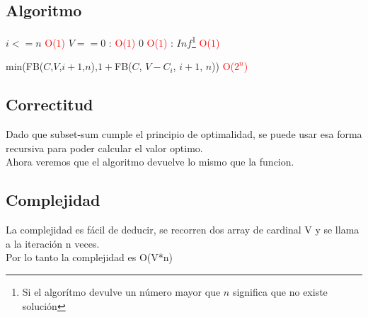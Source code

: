 \subsection{Algoritmo}
\begin{codebox}
    \li \If $i <= n$ \quad\quad\quad\quad\quad\quad\quad\textcolor{red}{O($1$)}
        \Then
    \li        \If $V == 0$ : \quad\quad\quad\quad\quad\quad\textcolor{red}{O($1$)}
                \Then
    \li             \Return $0$ \quad\quad\quad\quad\quad\quad\quad\textcolor{red}{O($1$)}
    \li         \Else: 
    \li                 \Return $Inf$\footnote{Si el algor\'itmo devulve un n\'umero mayor que $n$ significa que no existe soluci\'on} \quad\quad\quad\quad\quad\quad\quad\textcolor{red}{O($1$)}
                \End
                \End

    \li \Return min(FB($C$,$V$,$i+1$,$n$),$1 +$FB($C$, $V-C_{i}$, $i+1$, $n$)) \textcolor{red}{O($2^n$)}

    \end{codebox}
\subsection{Correctitud}
Dado que subset-sum cumple el principio de optimalidad, se puede usar esa forma recursiva para poder calcular el valor optimo.\\
Ahora veremos que el algoritmo devuelve lo mismo que la funcion.\\
\subsection{Complejidad}
La complejidad es f\'acil de deducir, se recorren dos array de cardinal V y se llama a la iteraci\'on n veces.\\
Por lo tanto la complejidad es O(V*n)